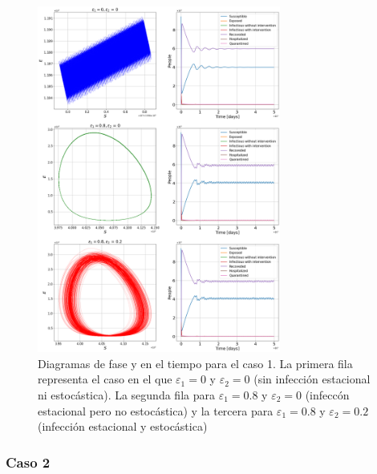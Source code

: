 \documentclass[conference]{IEEEtran}
\begin{document}
\begin{figure}[h]
    \centering
    \includegraphics[width=8cm]{../Figures/case_1.png}
    \caption{Diagramas de fase y en el tiempo para el caso 1. La primera fila representa el caso en el que $\varepsilon_1 = 0$
    y $\varepsilon_2 = 0$ (sin infección estacional ni estocástica). La segunda fila para $\varepsilon_1 = 0.8$ y $\varepsilon_2 = 0$ (infeccón 
    estacional pero no estocástica) y la tercera para $\varepsilon_1 = 0.8$ y $\varepsilon_2 = 0.2$ 
    (infección estacional y estocástica)}
    \label{case_1}
\end{figure}

\subsubsection{Caso 2}
\end{document}
